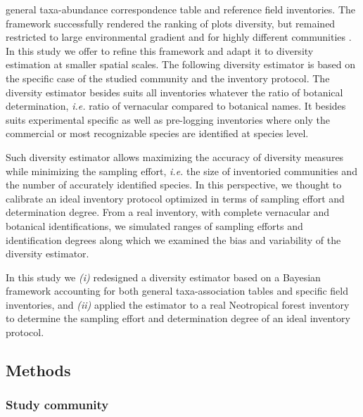 \documentclass[
  11pt,
  french,
  A4paper,
  extrafontsizes,onecolumn,openright
  ]{memoir}
\begin{document}
general taxa-abundance correspondence table \autocite{Molino2009} and
reference field inventories. The framework successfully rendered the
ranking of plots diversity, but remained restricted to large
environmental gradient and for highly different communities
\autocites{Guitet2014b}{Guitet2013}. In this study we offer to refine
this framework and adapt it to diversity estimation at smaller spatial
scales. The following diversity estimator is based on the specific case
of the studied community and the inventory protocol. The diversity
estimator besides suits all inventories whatever the ratio of botanical
determination, \emph{i.e.} ratio of vernacular compared to botanical
names. It besides suits experimental specific as well as pre-logging
inventories where only the commercial or most recognizable species are
identified at species level.

Such diversity estimator allows maximizing the accuracy of diversity
measures while minimizing the sampling effort, \emph{i.e.} the size of
inventoried communities and the number of accurately identified species.
In this perspective, we thought to calibrate an ideal inventory protocol
optimized in terms of sampling effort and determination degree. From a
real inventory, with complete vernacular and botanical identifications,
we simulated ranges of sampling efforts and identification degrees along
which we examined the bias and variability of the diversity estimator.

In this study we \emph{(i)} redesigned a diversity estimator based on a
Bayesian framework accounting for both general taxa-association tables
and specific field inventories, and \emph{(ii)} applied the estimator to
a real Neotropical forest inventory to determine the sampling effort and
determination degree of an ideal inventory protocol.

\subsection{Methods}\label{methods}

\subsubsection{Study community}\label{study-community}
\end{document}
